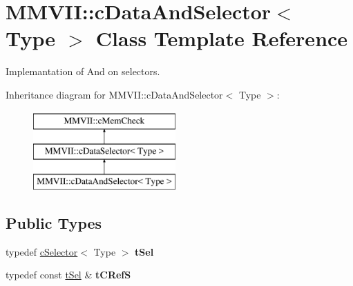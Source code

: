 \hypertarget{classMMVII_1_1cDataAndSelector}{}\section{M\+M\+V\+II\+:\+:c\+Data\+And\+Selector$<$ Type $>$ Class Template Reference}
\label{classMMVII_1_1cDataAndSelector}


Implemantation of And on selectors.  


Inheritance diagram for M\+M\+V\+II\+:\+:c\+Data\+And\+Selector$<$ Type $>$\+:\begin{figure}[H]
\begin{center}
\leavevmode
\includegraphics[height=3.000000cm]{classMMVII_1_1cDataAndSelector}
\end{center}
\end{figure}
\subsection*{Public Types}
\begin{DoxyCompactItemize}
\item 
typedef \hyperlink{classMMVII_1_1cSelector}{c\+Selector}$<$ Type $>$ {\bfseries t\+Sel}\hypertarget{classMMVII_1_1cDataAndSelector_ac66aa7aa71e579dfe2ee2976798a3939}{}\label{classMMVII_1_1cDataAndSelector_ac66aa7aa71e579dfe2ee2976798a3939}

\item 
typedef const \hyperlink{classMMVII_1_1cSelector}{t\+Sel} \& {\bfseries t\+C\+RefS}\hypertarget{classMMVII_1_1cDataAndSelector_aec99c7c40292993573856b4104b09eb8}{}\label{classMMVII_1_1cDataAndSelector_aec99c7c40292993573856b4104b09eb8}

\end{DoxyCompactItemize}
